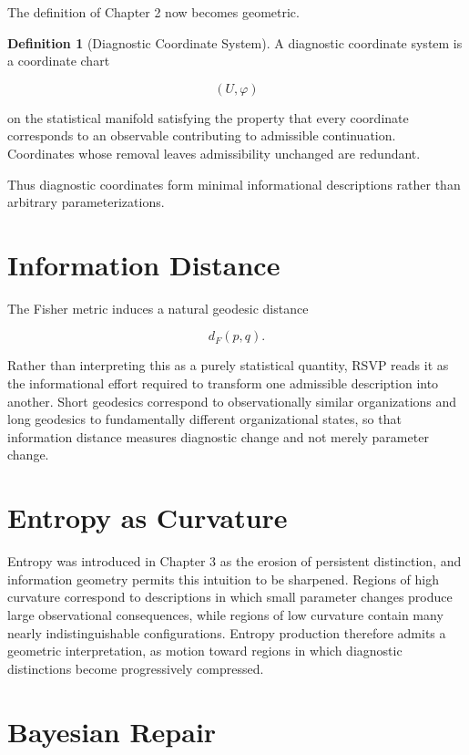 \documentclass[11pt,oneside]{book}
\numberwithin{equation}{chapter}
\theoremstyle{definition}
\newtheorem{definition}{Definition}[chapter]
\theoremstyle{plain}
\begin{document}
The definition of Chapter 2 now becomes geometric.

\begin{definition}[Diagnostic Coordinate System]

A diagnostic coordinate system is a coordinate chart

\[
(U,\varphi)
\]

on the statistical manifold satisfying the property that every coordinate corresponds to an observable contributing to admissible continuation. Coordinates whose removal leaves admissibility unchanged are redundant.

\end{definition}

Thus diagnostic coordinates form minimal informational descriptions rather
than arbitrary parameterizations.

\section{Information Distance}

The Fisher metric induces a natural geodesic distance

\[
d_F(p,q).
\]

Rather than interpreting this as a purely statistical quantity, RSVP reads it as the informational effort required to transform one admissible description into another. Short geodesics correspond to observationally similar organizations and long geodesics to fundamentally different organizational states, so that information distance measures diagnostic change and not merely parameter change.

\section{Entropy as Curvature}

Entropy was introduced in Chapter 3 as the erosion of persistent distinction, and information geometry permits this intuition to be sharpened. Regions of high curvature correspond to descriptions in which small parameter changes produce large observational consequences, while regions of low curvature contain many nearly indistinguishable configurations. Entropy production therefore admits a geometric interpretation, as motion toward regions in which diagnostic distinctions become progressively compressed.

\section{Bayesian Repair}
\end{document}
